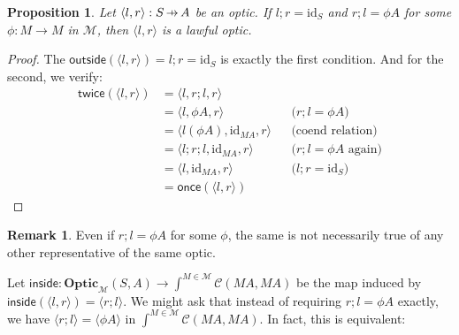 \documentclass[11pt,a4paper]{article}
\theoremstyle{plain}
\newtheorem{proposition}[theorem]{Proposition}
\theoremstyle{definition}
\newtheorem{remark}[theorem]{Remark}
\newcommand{\C}{\mathscr{C}}
\newcommand{\M}{\mathscr{M}}
\newcommand{\Optic}{\mathbf{Optic}}
\newcommand{\id}{\mathrm{id}}
\newcommand{\inside}{\mathsf{inside}}
\newcommand{\outside}{\mathsf{outside}}
\newcommand{\once}{\mathsf{once}}
\newcommand{\twice}{\mathsf{twice}}
\newcommand{\hto}{\ensuremath{\,\mathaccent\shortmid\rightarrow\,}}
\begin{document}
\begin{proposition}
  Let $\langle l, r \rangle : S \hto A$ be an optic. If $l;r = \id_S$ and $r;l = \phi A$ for some $\phi : M \to M$ in $\M$, then $\langle l, r \rangle$ is a lawful optic.
\end{proposition}
\begin{proof}
  The $\outside(\langle l, r \rangle) = l;r = \id_S$ is exactly the first condition. And for the second, we verify:
  \begin{align*}
    \twice(\langle l, r \rangle)
    &= \langle l, r;l, r \rangle \\
    &= \langle l, \phi A, r \rangle && \text{($r;l = \phi A$)}\\
    &= \langle l (\phi A), \id_{MA}, r \rangle && \text{(coend relation)} \\
    &= \langle l;r;l, \id_{MA}, r \rangle && \text{($r;l = \phi A$ again)}\\
    &= \langle l, \id_{MA}, r \rangle  && \text{($l;r = \id_S$)}\\
    &= \once(\langle l, r \rangle)
  \end{align*}
\end{proof}

\begin{remark}
  Even if $r;l = \phi A$ for some $\phi$, the same is not necessarily true of any other representative of the same optic.
\end{remark}

Let $\inside : \Optic_\M(S, A) \to \int^{M \in \M} \C(M A, M A)$ be the map induced by $\inside(\langle l, r \rangle) = \langle r ; l \rangle$. We might ask that instead of requiring $r;l = \phi A$ exactly, we have $\langle r ; l \rangle = \langle \phi A \rangle$ in $\int^{M \in \M} \C(M A, M A)$. In fact, this is equivalent:
\end{document}
